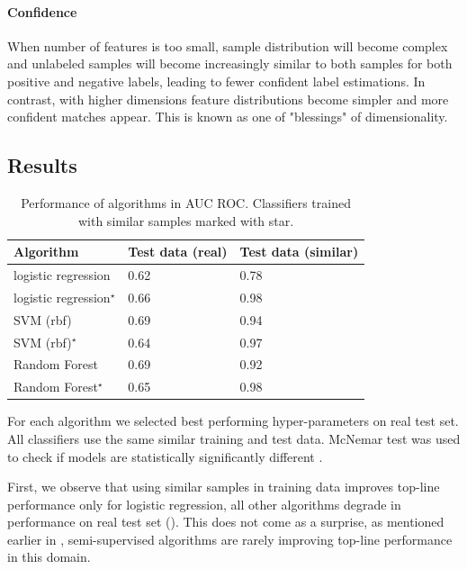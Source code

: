 \documentclass{article}
\begin{document}
\paragraph{Confidence}
When number of features is too small, sample distribution will become complex and unlabeled samples will become increasingly similar to both samples for both positive and negative labels, leading to fewer confident label estimations. In contrast, with higher dimensions feature distributions become simpler and more confident matches appear. This is known as one of "blessings" of dimensionality.

\subsection{Results}
\label{result}

\begin{table}
    \centering
    \begin{tabular}{lll}
        \toprule
        Algorithm & Test data (real) & Test data (similar) \\
        \midrule
        logistic regression             & 0.62  & 0.78  \\
        logistic regression$^\star$     & 0.66  & 0.98  \\
        SVM (rbf)                       & 0.69  & 0.94  \\
        SVM (rbf)$^\star$               & 0.64  & 0.97  \\
        Random Forest                   & 0.69  & 0.92  \\
        Random Forest$^\star$           & 0.65  & 0.98  \\
        \bottomrule
    \end{tabular}
    \caption{Performance of algorithms in AUC ROC. Classifiers trained with similar samples marked with star.}
    \label{tab:performance-comparison}
\end{table}

For each algorithm we selected best performing hyper-parameters on real test set. All classifiers use the same similar training and test data. McNemar test was used to check if models are statistically significantly different \cite{compare-clf}.

First, we observe that using similar samples in training data improves top-line performance only for logistic regression, all other algorithms degrade in performance on real test set (). This does not come as a surprise, as mentioned earlier in , semi-supervised algorithms are rarely improving top-line performance in this domain.
\end{document}
